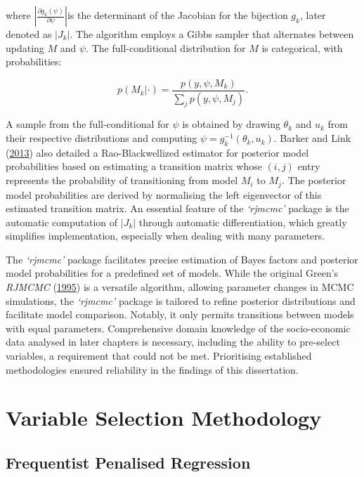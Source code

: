 \documentclass[
  11pt,
]{article}
\begin{document}
where \(\left| \frac{\partial g_k(\psi)}{\partial \psi} \right|\)is the
determinant of the Jacobian for the bijection \(g_k\), later denoted as
\(|J_k|\). The algorithm employs a Gibbs sampler that alternates between
updating \(M\) and \(\psi\). The full-conditional distribution for \(M\)
is categorical, with probabilities:

\begin{equation}
p(M_k|\cdot) = \frac{p(y,\psi,M_k)}{\sum_j p(y,\psi,M_j)}.
\end{equation}

A sample from the full-conditional for \(\psi\) is obtained by drawing
\(\theta_k\) and \(u_k\) from their respective distributions and
computing \(\psi=g_k^{-1}(\theta_k,u_k)\). Barker and Link
(\protect\hyperlink{ref-Barker2013}{2013}) also detailed a
Rao-Blackwellized estimator for posterior model probabilities based on
estimating a transition matrix whose \((i, j)\) entry represents the
probability of transitioning from model \(M_i\) to \(M_j\). The
posterior model probabilities are derived by normalising the left
eigenvector of this estimated transition matrix. An essential feature of
the \emph{`rjmcmc'} package is the automatic computation of \(|J_k|\)
through automatic differentiation, which greatly simplifies
implementation, especially when dealing with many parameters.

The \emph{`rjmcmc'} package facilitates precise estimation of Bayes
factors and posterior model probabilities for a predefined set of
models. While the original Green's \emph{RJMCMC}
(\protect\hyperlink{ref-Green1995}{1995}) is a versatile algorithm,
allowing parameter changes in MCMC simulations, the \emph{`rjmcmc'}
package is tailored to refine posterior distributions and facilitate
model comparison. Notably, it only permits transitions between models
with equal parameters. Comprehensive domain knowledge of the
socio-economic data analysed in later chapters is necessary, including
the ability to pre-select variables, a requirement that could not be
met. Prioritising established methodologies ensured reliability in the
findings of this dissertation.

\newpage

\section{Variable Selection Methodology}

\subsection{Frequentist Penalised Regression}
\end{document}
